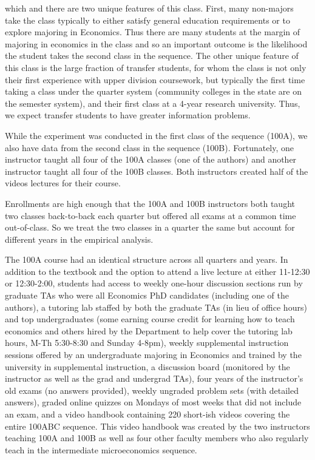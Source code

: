 \documentclass[12pt]{article}
\begin{document}
which and there are two unique features of this class.  First, many non-majors take the class typically to either satisfy general education requirements or to explore majoring in Economics.  Thus there are many students at the margin of majoring in economics in the class and so an important outcome is the likelihood the student takes the second class in the sequence.  The other unique feature of this class is the large fraction of transfer students, for whom the class is not only their first experience with upper division coursework, but typically the first time taking a class under the quarter system (community colleges in the state are on the semester system), and their first class at a 4-year research university.  Thus, we expect transfer students to have greater information problems. 

While the experiment was conducted in the first class of the sequence (100A), we also have data from the second class in the sequence (100B).  Fortunately, one instructor taught all four of the 100A classes (one of the authors) and another instructor taught all four of the 100B classes.  Both instructors created half of the videos lectures for their course.  

Enrollments are high enough that the 100A and 100B instructors both taught two classes back-to-back each quarter but offered all exams at a common time out-of-class.  So we treat the two classes in a quarter the same but account for different years in the empirical analysis.  

The 100A course had an identical structure across all quarters and years.  In addition to the textbook and the option to attend a live lecture at either 11-12:30 or 12:30-2:00, students had access to weekly one-hour discussion sections run by graduate TAs who were all Economics PhD candidates (including one of the authors), a tutoring lab staffed by both the graduate TAs (in lieu of office hours) and top undergraduates (some earning course credit for learning how to teach economics and others hired by the Department to help cover the tutoring lab hours, M-Th 5:30-8:30 and Sunday 4-8pm), weekly supplemental instruction sessions offered by an undergraduate majoring in Economics and trained by the university in supplemental instruction, a discussion board (monitored by the instructor as well as the grad and undergrad TAs), four years of the instructor's old exams (no answers provided), weekly ungraded problem sets (with detailed answers), graded online quizzes on Mondays of most weeks that did not include an exam, and a video handbook containing 220 short-ish videos covering the entire 100ABC sequence.  This video handbook was created by the two instructors teaching 100A and 100B as well as four other faculty members who also regularly teach in the intermediate microeconomics sequence. 
\end{document}
